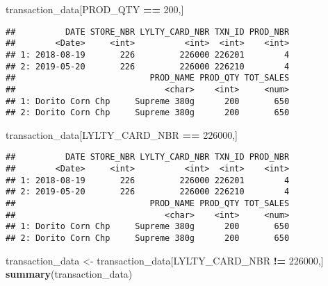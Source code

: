 \documentclass[
]{article}
\newenvironment{Shaded}{\begin{snugshade}}{\end{snugshade}}
\newcommand{\DecValTok}[1]{\textcolor[rgb]{0.00,0.00,0.81}{#1}}
\newcommand{\FunctionTok}[1]{\textcolor[rgb]{0.13,0.29,0.53}{\textbf{#1}}}
\newcommand{\NormalTok}[1]{#1}
\newcommand{\OtherTok}[1]{\textcolor[rgb]{0.56,0.35,0.01}{#1}}
\newcommand{\SpecialCharTok}[1]{\textcolor[rgb]{0.81,0.36,0.00}{\textbf{#1}}}
\begin{document}
\begin{Shaded}
\begin{Highlighting}[]
\NormalTok{transaction\_data[PROD\_QTY }\SpecialCharTok{==} \DecValTok{200}\NormalTok{,]}
\end{Highlighting}
\end{Shaded}

\begin{verbatim}
##          DATE STORE_NBR LYLTY_CARD_NBR TXN_ID PROD_NBR
##        <Date>     <int>          <int>  <int>    <int>
## 1: 2018-08-19       226         226000 226201        4
## 2: 2019-05-20       226         226000 226210        4
##                           PROD_NAME PROD_QTY TOT_SALES
##                              <char>    <int>     <num>
## 1: Dorito Corn Chp     Supreme 380g      200       650
## 2: Dorito Corn Chp     Supreme 380g      200       650
\end{verbatim}

\begin{Shaded}
\begin{Highlighting}[]
\NormalTok{transaction\_data[LYLTY\_CARD\_NBR }\SpecialCharTok{==} \DecValTok{226000}\NormalTok{,]}
\end{Highlighting}
\end{Shaded}

\begin{verbatim}
##          DATE STORE_NBR LYLTY_CARD_NBR TXN_ID PROD_NBR
##        <Date>     <int>          <int>  <int>    <int>
## 1: 2018-08-19       226         226000 226201        4
## 2: 2019-05-20       226         226000 226210        4
##                           PROD_NAME PROD_QTY TOT_SALES
##                              <char>    <int>     <num>
## 1: Dorito Corn Chp     Supreme 380g      200       650
## 2: Dorito Corn Chp     Supreme 380g      200       650
\end{verbatim}

\begin{Shaded}
\begin{Highlighting}[]
\NormalTok{transaction\_data }\OtherTok{\textless{}{-}}\NormalTok{ transaction\_data[LYLTY\_CARD\_NBR }\SpecialCharTok{!=} \DecValTok{226000}\NormalTok{,]}
\FunctionTok{summary}\NormalTok{(transaction\_data)}
\end{Highlighting}
\end{Shaded}
\end{document}
